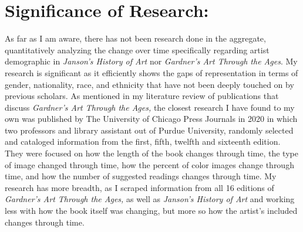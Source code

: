 \documentclass[
  letterpaper,
  DIV=11,
  numbers=noendperiod]{scrreprt}
\begin{document}
\hypertarget{significance-of-research}{%
\chapter{\texorpdfstring{\textbf{Significance of
Research:}}{Significance of Research:}}\label{significance-of-research}}

As far as I am aware, there has not been research done in the aggregate,
quantitatively analyzing the change over time specifically regarding
artist demographic in \emph{Janson's History of Art} nor \emph{Gardner's
Art Through the Ages}. My research is significant as it efficiently
shows the gaps of representation in terms of gender, nationality, race,
and ethnicity that have not been deeply touched on by previous scholars.
As mentioned in my literature review of publications that discuss
\emph{Gardner's Art Through the Ages,} the closest research I have found
to my own was published by The University of Chicago Press Journals in
2020 in which two professors and library assistant out of Purdue
University, randomly selected and cataloged information from the first,
fifth, twelfth and sixteenth edition. They were focused on how the
length of the book changes through time, the type of image changed
through time, how the percent of color images change through time, and
how the number of suggested readings changes through time. My research
has more breadth, as I scraped information from all 16 editions of
\emph{Gardner's Art Through the Ages,} as well as \emph{Janson's History
of Art} and working less with how the book itself was changing, but more
so how the artist's included changes through time.
\end{document}
